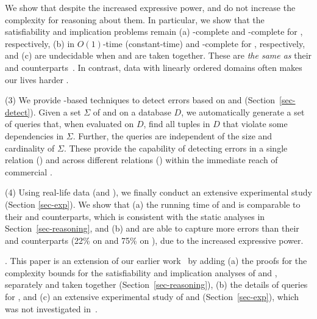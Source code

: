 We show that despite the increased expressive power,
\pCFDs and \pCINDs do not increase the complexity for
reasoning about them. In particular, we show that
the satisfiability and implication problems remain
(a) \NP-complete and \coNP-complete for \pCFDs, respectively,
(b) in $O(1)$-time (constant-time) and \EXPTIME-complete
for \pCINDs, respectively,
and (c) are undecidable when \pCFDs and \pCINDs are taken together.
These are {\em the same as} their \CFDs and \CINDs counterparts~\cite{tcs-CINDs}.
In contrast, data with linearly ordered domains often makes our lives harder \cite{Mayden97}.


\sstab
\noindent(3) We provide \SQL-based techniques to detect errors
based on \pCFDs and \pCINDs (Section~\ref{sec-detect}). Given a set $\Sigma$ of {\pCFDs}
and \pCINDs on a database $D$, we automatically generate
a set of \SQL queries that, when evaluated on $D$, find all tuples in $D$ that
violate some dependencies in $\Sigma$. Further,
the \SQL queries are independent of the size and cardinality
of $\Sigma$.
These provide the capability of detecting errors in a single
relation (\pCFDs) and across different relations (\pCINDs)
within the immediate reach of commercial \rdms.


\sstab
\noindent(4) Using real-life data (\hosp and \dblp), we finally conduct
an extensive experimental study (Section \ref{sec-exp}). We show that (a) the running time of \pCFDs and \pCINDs is comparable to their \CFDs and \CINDs counterparts, which is consistent with the static analyses in Section~\ref{sec-reasoning}, and (b) \pCFDs and \pCINDs are able to capture more errors  than their \CFDs and \CINDs counterparts (22\% on \hosp and  75\% on \dblp), due to the increased expressive power.



. This paper is an extension of our earlier work~\cite{dexaChenFM09} by adding  %
(a) the proofs for the complexity bounds for the satisfiability and
implication analyses of \pCFDs and \pCINDs, separately and taken together (Section~\ref{sec-reasoning}),
(b) the details of \SQL queries for \pCFDs,
and (c) an extensive experimental study of \pCFDs and \pCINDs (Section~\ref{sec-exp}), which was not investigated in~\cite{dexaChenFM09}.


